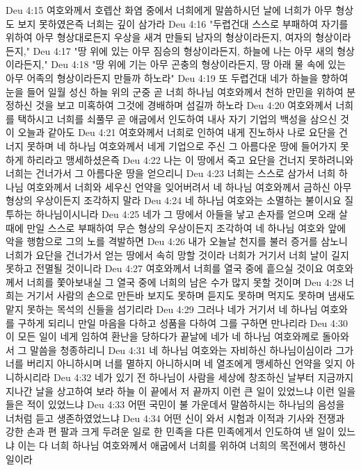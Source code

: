 Deu 4:15  여호와께서 호렙산 화염 중에서 너희에게 말씀하시던 날에 너희가 아무 형상도 보지 못하였은즉 너희는 깊이 삼가라
Deu 4:16  "두렵건대 스스로 부패하여 자기를 위하여 아무 형상대로든지 우상을 새겨 만들되 남자의 형상이라든지, 여자의 형상이라든지,"
Deu 4:17  "땅 위에 있는 아무 짐승의 형상이라든지, 하늘에 나는 아무 새의 형상이라든지,"
Deu 4:18  "땅 위에 기는 아무 곤충의 형상이라든지, 땅 아래 물 속에 있는 아무 어족의 형상이라든지 만들까 하노라"
Deu 4:19  또 두렵건대 네가 하늘을 향하여 눈을 들어 일월 성신 하늘 위의 군중 곧 너희 하나님 여호와께서 천하 만민을 위하여 분정하신 것을 보고 미혹하여 그것에 경배하며 섬길까 하노라
Deu 4:20  여호와께서 너희를 택하시고 너희를 쇠풀무 곧 애굽에서 인도하여 내사 자기 기업의 백성을 삼으신 것이 오늘과 같아도
Deu 4:21  여호와께서 너희로 인하여 내게 진노하사 나로 요단을 건너지 못하며 네 하나님 여호와께서 네게 기업으로 주신 그 아름다운 땅에 들어가지 못하게 하리라고 맹세하셨은즉
Deu 4:22  나는 이 땅에서 죽고 요단을 건너지 못하려니와 너희는 건너가서 그 아름다운 땅을 얻으리니
Deu 4:23  너희는 스스로 삼가서 너희 하나님 여호와께서 너희와 세우신 언약을 잊어버려서 네 하나님 여호와께서 금하신 아무 형상의 우상이든지 조각하지 말라
Deu 4:24  네 하나님 여호와는 소멸하는 불이시요 질투하는 하나님이시니라
Deu 4:25  네가 그 땅에서 아들을 낳고 손자를 얻으며 오래 살 때에 만일 스스로 부패하여 무슨 형상의 우상이든지 조각하여 네 하나님 여호와 앞에 악을 행함으로 그의 노를 격발하면
Deu 4:26  내가 오늘날 천지를 불러 증거를 삼노니 너희가 요단을 건너가서 얻는 땅에서 속히 망할 것이라 너희가 거기서 너희 날이 길지 못하고 전멸될 것이니라
Deu 4:27  여호와께서 너희를 열국 중에 흩으실 것이요 여호와께서 너희를 쫓아보내실 그 열국 중에 너희의 남은 수가 많지 못할 것이며
Deu 4:28  너희는 거기서 사람의 손으로 만든바 보지도 못하며 듣지도 못하며 먹지도 못하며 냄새도 맡지 못하는 목석의 신들을 섬기리라
Deu 4:29  그러나 네가 거기서 네 하나님 여호와를 구하게 되리니 만일 마음을 다하고 성품을 다하여 그를 구하면 만나리라
Deu 4:30  이 모든 일이 네게 임하여 환난을 당하다가 끝날에 네가 네 하나님 여호와께로 돌아와서 그 말씀을 청종하리니
Deu 4:31  네 하나님 여호와는 자비하신 하나님이심이라 그가 너를 버리지 아니하시며 너를 멸하지 아니하시며 네 열조에게 맹세하신 언약을 잊지 아니하시리라
Deu 4:32  네가 있기 전 하나님이 사람을 세상에 창조하신 날부터 지금까지 지나간 날을 상고하여 보라 하늘 이 끝에서 저 끝까지 이런 큰 일이 있었느냐 이런 일을 들은 적이 있었느냐
Deu 4:33  어떤 국민이 불 가운데서 말씀하시는 하나님의 음성을 너처럼 듣고 생존하였었느냐
Deu 4:34  어떤 신이 와서 시험과 이적과 기사와 전쟁과 강한 손과 편 팔과 크게 두려운 일로 한 민족을 다른 민족에게서 인도하여 낸 일이 있느냐 이는 다 너희 하나님 여호와께서 애굽에서 너희를 위하여 너희의 목전에서 행하신 일이라
